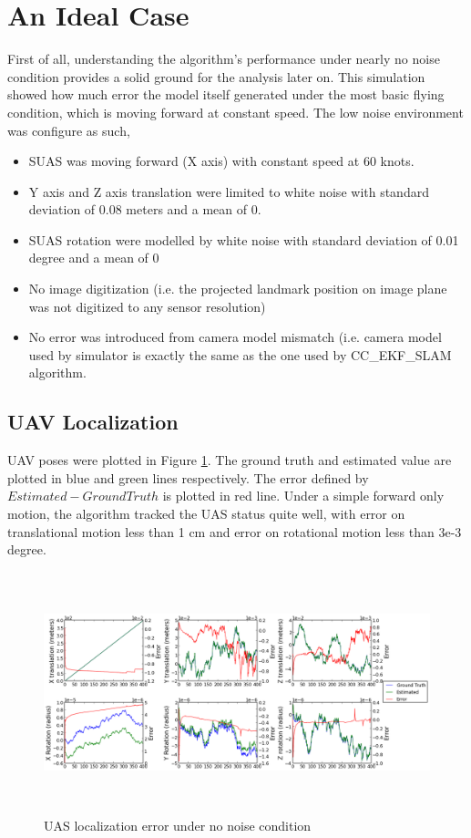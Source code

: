 \section{An Ideal Case}
First of all, understanding the algorithm's performance under nearly
no noise condition provides a solid ground for the analysis later on.
This simulation showed how much error the model itself generated under
the most basic flying condition, which is moving forward at constant
speed. The low noise environment was configure as such,

\begin{itemize}
  \item SUAS was moving forward (X axis) with constant speed at 60 knots. 
  \item Y axis and Z axis translation were limited to white noise with
  standard deviation of 0.08 meters and a mean of 0.
  \item SUAS rotation were modelled by white noise with standard
  deviation of 0.01 degree and a mean of 0
  \item No image digitization (i.e. the projected landmark position on
  image plane was not digitized to any sensor resolution)
  \item No error was introduced from camera model mismatch (i.e.
  camera model used by simulator is exactly the same as the one used
  by CC\_EKF\_SLAM algorithm.
\end{itemize}

\subsection{UAV Localization}
UAV poses were plotted in Figure \ref{fig:simfig1}. The ground truth
and estimated value are plotted in blue and green lines respectively.
The error defined by $Estimated-Ground Truth$ is plotted in red line.
Under a simple forward only motion, the algorithm tracked the UAS
status quite well, with error on translational motion less than 1 cm
and error on rotational motion less than 3e-3 degree.

\begin{figure}[h]
\centering
\includegraphics[width=15cm, height=7cm]{./Figures/SimulationFigures/Figure1.png}
\caption{UAS localization error under no noise condition}
\label{fig:simfig1}
\end{figure}
\FloatBarrier

